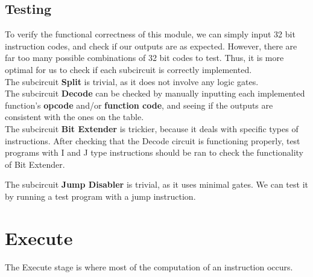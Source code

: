 \documentclass{article}
\begin{document}
\subsection{Testing}
To verify the functional correctness of this module, we can simply input 32 bit instruction codes, and check if our outputs are as expected. However, there are far too many possible combinations of 32 bit codes to test. Thus, it is more optimal for us to check if each subcircuit is correctly implemented. \\

\noindent The subcircuit \textbf{Split} is trivial, as it does not involve any logic gates. \\

\noindent The subcircuit \textbf{Decode} can be checked by manually inputting each implemented function's \textbf{opcode} and/or \textbf{function code}, and seeing if the outputs are consistent with the ones on the table. \\ 

\noindent The subcircuit \textbf{Bit Extender} is trickier, because it deals with specific types of instructions. After checking that the Decode circuit is functioning properly, test programs with I and J type instructions should be ran to check the functionality of Bit Extender.

\noindent The subcircuit \textbf{Jump Disabler} is trivial, as it uses minimal gates. We can test it by running a test program with a jump instruction.

\section{Execute}
The Execute stage is where most of the computation of an instruction occurs.
\end{document}
